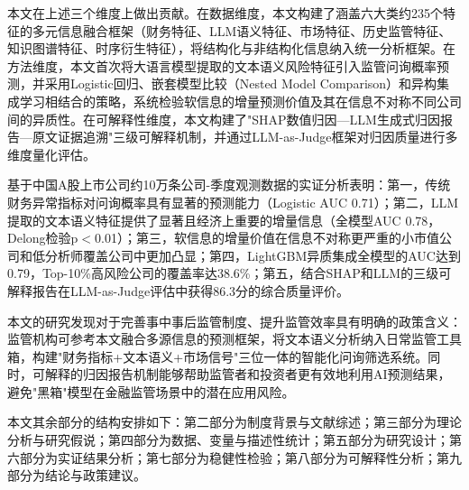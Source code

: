 本文在上述三个维度上做出贡献。在数据维度，本文构建了涵盖六大类约235个特征的多元信息融合框架（财务特征、LLM语义特征、市场特征、历史监管特征、知识图谱特征、时序衍生特征），将结构化与非结构化信息纳入统一分析框架。在方法维度，本文首次将大语言模型提取的文本语义风险特征引入监管问询概率预测，并采用Logistic回归、嵌套模型比较（Nested Model Comparison）\citep{delong1988comparing}和异构集成学习相结合的策略，系统检验软信息的增量预测价值及其在信息不对称不同公司间的异质性。在可解释性维度，本文构建了"SHAP数值归因—LLM生成式归因报告—原文证据追溯"三级可解释机制，并通过LLM-as-Judge框架对归因质量进行多维度量化评估\citep{zheng2024judge}。

基于中国A股上市公司约10万条公司-季度观测数据的实证分析表明：第一，传统财务异常指标对问询概率具有显著的预测能力（Logistic AUC 0.71）；第二，LLM提取的文本语义特征提供了显著且经济上重要的增量信息（全模型AUC 0.78，Delong检验p$<$0.01）；第三，软信息的增量价值在信息不对称更严重的小市值公司和低分析师覆盖公司中更加凸显；第四，LightGBM异质集成全模型的AUC达到0.79，Top-10\%高风险公司的覆盖率达38.6\%；第五，结合SHAP和LLM的三级可解释报告在LLM-as-Judge评估中获得86.3分的综合质量评价。

本文的研究发现对于完善事中事后监管制度、提升监管效率具有明确的政策含义：监管机构可参考本文融合多源信息的预测框架，将文本语义分析纳入日常监管工具箱，构建"财务指标+文本语义+市场信号"三位一体的智能化问询筛选系统。同时，可解释的归因报告机制能够帮助监管者和投资者更有效地利用AI预测结果，避免"黑箱"模型在金融监管场景中的潜在应用风险。

本文其余部分的结构安排如下：第二部分为制度背景与文献综述；第三部分为理论分析与研究假说；第四部分为数据、变量与描述性统计；第五部分为研究设计；第六部分为实证结果分析；第七部分为稳健性检验；第八部分为可解释性分析；第九部分为结论与政策建议。